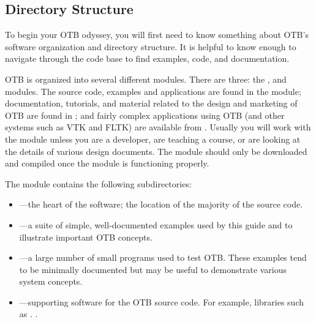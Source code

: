 \subsection{Directory Structure}
\label{sec:DirectoryStructure}

To begin your OTB odyssey, you will first need to know something about OTB's
software organization and directory structure. It is helpful to know enough to
navigate through the
code base to find examples, code, and documentation.

OTB is organized into several different modules. There are three:
the ,  and 
modules. The source code, examples and applications are found in the
 module; documentation, tutorials, and material related to the
design and marketing of OTB are found in ; and fairly
complex applications using OTB (and other systems such as VTK and FLTK)
are available from . Usually you will work with the
 module unless you are a developer, are teaching a course, or
are looking at the details of various design documents. The
 module should only be downloaded and
compiled once the  module is functioning properly.

The  module contains the following subdirectories:
\begin{itemize}
        \item {}---the heart of the software; the location
        of the majority of the source code.
        \item {}---a suite of simple, well-documented
        examples used by this guide and to illustrate important
        OTB concepts.
        \item {}---a large number of small programs used
        to test OTB. These examples tend to be minimally documented but may
        be useful to demonstrate various system concepts.
        \item {}---supporting software for the OTB
        source code. For example, libraries such as .%
.
\end{itemize}

